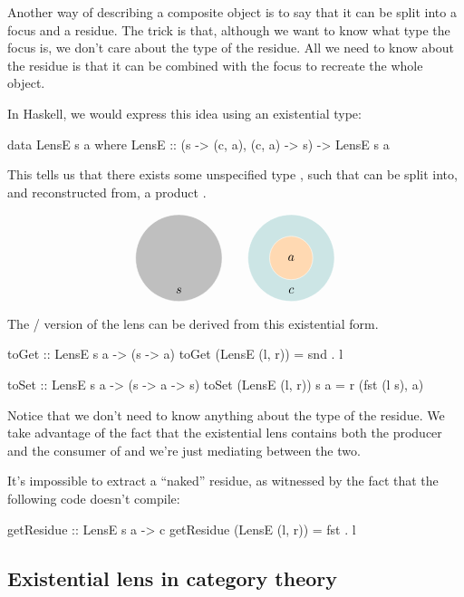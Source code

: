 \documentclass[DaoFP]{subfiles}
\begin{document}
Another way of describing a composite object is to say that it can be split into a focus and a residue. The trick is that, although we want to know what type the focus is, we don't care about the type of the residue. All we need to know about the residue is that it can be combined with the focus to recreate the whole object. 

In Haskell, we would express this idea using an existential type:
\begin{haskell}
data LensE s a where
    LensE :: (s -> (c, a), (c, a) -> s) -> LensE s a
\end{haskell}
This tells us that there exists some unspecified type , such that  can be split into, and reconstructed from, a product . 

\[
\begin{tikzpicture}
\filldraw[fill=gray!50, draw=white] (0, 0) circle (1.2);
\node at (0, -0.9) {$s$};
\end{tikzpicture}
\hspace{20pt}
\begin{tikzpicture}
\filldraw[fill=blue!50!green!20, draw=white] (0, 0) circle (1.2);
\filldraw[fill=orange!30, draw=white] (0, 0) circle (0.6);
\node at (0, 0) {$a$};
\node at (0, -0.9) {$c$};
\end{tikzpicture}
\]


The / version of the lens can be derived from this existential form.
\begin{haskell}
toGet :: LensE s a -> (s -> a)
toGet (LensE (l, r)) = snd . l

toSet :: LensE s a -> (s -> a -> s)
toSet (LensE (l, r)) s a = r (fst (l s), a)
\end{haskell}

Notice that we don't need to know anything about the type of the residue. We take advantage of the fact that the existential lens contains both the producer and the consumer of  and we're just mediating between the two.

It's impossible to extract a ``naked'' residue, as witnessed by the fact that the following code doesn't compile:
\begin{haskell}
getResidue :: LensE s a -> c
getResidue (LensE (l, r)) = fst . l
\end{haskell}

\subsection{Existential lens in category theory}
\end{document}
